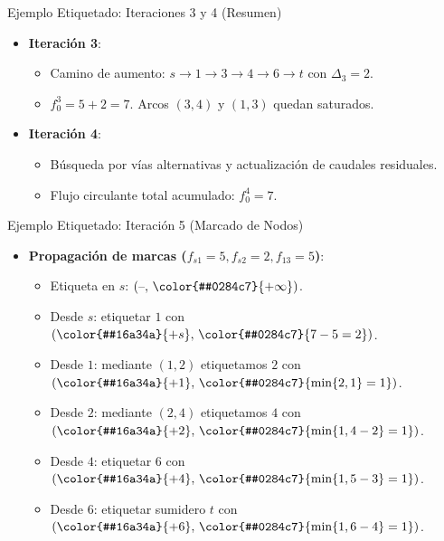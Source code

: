 \documentclass[
  ignorenonframetext,
]{beamer}
\providecommand{\tightlist}{%
  \setlength{\itemsep}{0pt}\setlength{\parskip}{0pt}}
\begin{document}
\begin{frame}{Ejemplo Etiquetado: Iteraciones 3 y 4 (Resumen)}
\label{ejemplo-etiquetado-iteraciones-3-y-4-resumen}
\begin{itemize}
\tightlist
\item
  \textbf{Iteración 3}:

  \begin{itemize}
  \tightlist
  \item
    Camino de aumento: \(s \to 1 \to 3 \to 4 \to 6 \to t\) con
    \(\Delta_3 = 2\).
  \item
    \(f_0^3 = 5 + 2 = 7\). Arcos \((3,4)\) y \((1,3)\) quedan saturados.
  \end{itemize}
\item
  \textbf{Iteración 4}:

  \begin{itemize}
  \tightlist
  \item
    Búsqueda por vías alternativas y actualización de caudales
    residuales.
  \item
    Flujo circulante total acumulado: \(f_0^4 = 7\).
  \end{itemize}
\end{itemize}
\end{frame}

\begin{frame}{Ejemplo Etiquetado: Iteración 5 (Marcado de Nodos)}
\label{ejemplo-etiquetado-iteraciuxf3n-5-marcado-de-nodos}
\begin{itemize}
\tightlist
\item
  \textbf{Propagación de marcas
  (\(f_{s1} = 5, f_{s2} = 2, f_{13} = 5\))}:

  \begin{itemize}
  \tightlist
  \item
    Etiqueta en \(s\): \((\text{–}, \, \color{#0284c7}{+\infty})\).
  \item
    Desde \(s\): etiquetar \(1\) con
    \((\color{#16a34a}{+s}, \, \color{#0284c7}{7 - 5 = 2})\).
  \item
    Desde \(1\): mediante \((1,2)\) etiquetamos \(2\) con
    \((\color{#16a34a}{+1}, \, \color{#0284c7}{\min\{2, 1\} = 1})\).
  \item
    Desde \(2\): mediante \((2,4)\) etiquetamos \(4\) con
    \((\color{#16a34a}{+2}, \, \color{#0284c7}{\min\{1, 4 - 2\} = 1})\).
  \item
    Desde \(4\): etiquetar \(6\) con
    \((\color{#16a34a}{+4}, \, \color{#0284c7}{\min\{1, 5 - 3\} = 1})\).
  \item
    Desde \(6\): etiquetar sumidero \(t\) con
    \((\color{#16a34a}{+6}, \, \color{#0284c7}{\min\{1, 6 - 4\} = 1})\).
  \end{itemize}
\end{itemize}
\end{frame}
\end{document}
